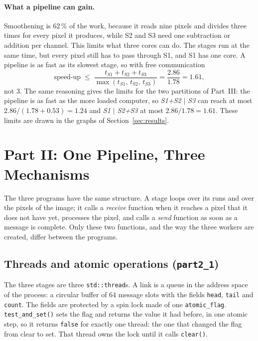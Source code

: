 \documentclass[11pt,a4paper]{article}
\begin{document}
\paragraph{What a pipeline can gain.} Smoothening is 62\,\% of the work, because it reads nine
pixels and divides three times for every pixel it produces, while S2 and S3 need one subtraction or
addition per channel. This limits what three cores can do. The stages run at the same time, but
every pixel still has to pass through S1, and S1 has one core. A pipeline is as fast as its slowest
stage, so with free communication
\[ \text{speed-up} \;\le\; \frac{t_{S1}+t_{S2}+t_{S3}}{\max(t_{S1},\,t_{S2},\,t_{S3})} = \frac{2.86}{1.78} = 1.61, \]
not 3. The same reasoning gives the limits for the two partitions of Part~III: the pipeline is as
fast as the more loaded computer, so \emph{S1+S2 $\vert$ S3} can reach at most
$2.86/(1.78+0.53) = 1.24$ and \emph{S1 $\vert$ S2+S3} at most $2.86/1.78 = 1.61$. These limits are
drawn in the graphs of Section~\ref{sec:results}.

\section{Part II: One Pipeline, Three Mechanisms}
\label{sec:design}

The three programs have the same structure. A stage loops over its runs and over the pixels of the
image; it calls a \emph{receive} function when it reaches a pixel that it does not have yet,
processes the pixel, and calls a \emph{send} function as soon as a message is complete. Only these
two functions, and the way the three workers are created, differ between the programs.

\subsection{Threads and atomic operations (\texttt{part2\_1})}

The three stages are three \texttt{std::thread}s. A link is a queue in the address space of the
process: a circular buffer of 64 message slots with the fields \texttt{head}, \texttt{tail} and
\texttt{count}. The fields are protected by a spin lock made of one \texttt{atomic\_flag}.
\texttt{test\_and\_set()} sets the flag and returns the value it had before, in one atomic step, so
it returns \texttt{false} for exactly one thread: the one that changed the flag from clear to set.
That thread owns the lock until it calls \texttt{clear()}.
\end{document}
